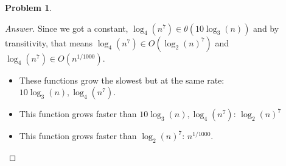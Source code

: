 \documentclass[11pt]{article}
\theoremstyle{definition}
\theoremstyle{definition}
\newtheorem{required}{Problem}
\theoremstyle{definition}
\begin{document}
\begin{required}
\begin{enumerate} [label=(\alph*)]
\begin{proof}[Answer]
Since we got a constant, $\log_{4}(n^7) \in \theta(10 \log_{3}(n))$ and by transitivity, that means $\log_{4}(n^7) \in O(\log_{2}(n)^7)$ and $\log_{4}(n^7) \in O(n^{1/1000})$.\\

\begin{itemize}
	\item These functions grow the slowest but at the same rate: $10\log_{3}(n), \log_{4}(n^7)$.
	\item This function grows faster than $10\log_{3}(n), \log_{4}(n^7)$: $\log_{2}(n)^7$
	\item This function grows faster than $\log_{2}(n)^7$: $n^{1/1000}$.
\end{itemize}
    \end{proof}
\end{enumerate}

\end{required}
\end{document}
